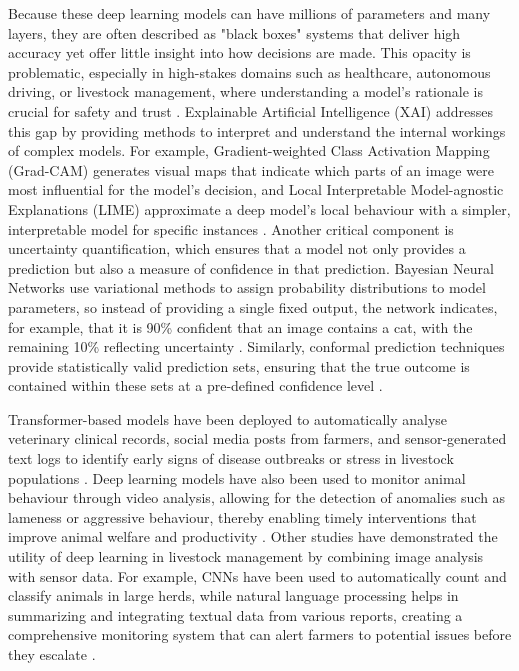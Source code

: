 Because these deep learning models can have millions of parameters and many layers, they are often described as "black boxes" systems that deliver high accuracy yet offer little insight into how decisions are made. This opacity is problematic, especially in high-stakes domains such as healthcare, autonomous driving, or livestock management, where understanding a model’s rationale is crucial for safety and trust \cite{bengio2013representation}. Explainable Artificial Intelligence (XAI) addresses this gap by providing methods to interpret and understand the internal workings of complex models. For example, Gradient-weighted Class Activation Mapping (Grad-CAM) generates visual maps that indicate which parts of an image were most influential for the model’s decision, and Local Interpretable Model-agnostic Explanations (LIME) approximate a deep model’s local behaviour with a simpler, interpretable model for specific instances 
\cite{ribeiro2016should, selvaraju2017grad}. Another critical component is uncertainty quantification, which ensures that a model not only provides a prediction but also a measure of confidence in that prediction. Bayesian Neural Networks use variational methods to assign probability distributions to model parameters, so instead of providing a single fixed output, the network indicates, for example, that it is 90\% confident that an image contains a cat, with the remaining 10\% reflecting uncertainty \cite{gal_dropout_2016}. Similarly, conformal prediction techniques provide statistically valid prediction sets, ensuring that the true outcome is contained within these sets at a pre-defined confidence level \cite{Angelopoulos2021}.

Transformer-based models have been deployed to automatically analyse veterinary clinical records, social media posts from farmers, and sensor-generated text logs to identify early signs of disease outbreaks or stress in livestock populations \cite{smith2020nlp}. Deep learning models have also been used to monitor animal behaviour through video analysis, allowing for the  detection of anomalies such as lameness or aggressive behaviour, thereby enabling timely interventions that improve animal welfare and productivity 
\cite{fischer2018deep, kamphuis2017animal}. Other studies have demonstrated the utility of deep learning in livestock management by combining image analysis with sensor data. For example, CNNs have been used to automatically count and classify animals in large herds, while natural language processing helps in summarizing and integrating textual data from various reports, creating a comprehensive monitoring system that can alert farmers to potential issues before they escalate \cite{raboisson2017machine, bakker2019predictive, lopez2020integrated}.

